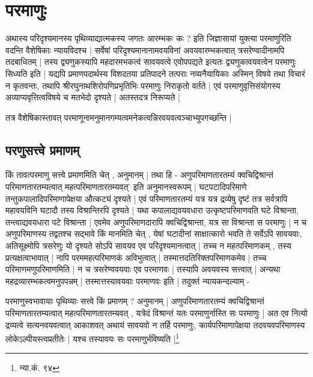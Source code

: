\section{परमाणुः}

अथास्य परिदृश्यमानस्य पृथिव्याद्यात्मकस्य जगतः आरम्भकः कः ? इति जिज्ञासायां युक्त्या परमाणुरिति वदन्ति वैशेषिकाः न्यायविदश्च | सर्वेषां परिदृश्यमानानामवयविनां अवयवारम्भकत्वात् त्रसरेण्वादीनामपि तदबाधितम् | तस्य द्व्यणुकस्यापि महदारमभकत्वं सावयवत्वे एवोपपद्यते इत्यतः द्व्यणुकावयवत्वेन परमाणुः सिध्यति इति | यद्यपि प्रमाणपदार्थस्य विशदतया प्रतिपादने तत्पराः नव्यनैयायिकाः अस्मिन् विषये तथा विचारं न कृतवन्तः, तथापि श्रीरघुनाथशिरोपणिप्रभृतिभिः परमाणुः निराकृतो वर्तते | एवं परमाणुवृत्तिसंयोगस्य अव्याप्यवृत्तित्वविषये च मतभेदो दृश्यते | अतस्तदत्र निरूप्यते |

तत्र वैशेषिकास्तावत् परमाणूनामनुमानगम्यत्वमनेकत्वन्निरवयवत्वञ्चाभ्युपगच्छन्ति |

\subsection{परणुसत्त्वे प्रमाणम्}

किं तावत्परमाणु सत्त्वे प्रमाणमिति चेत् , अनुमानम् | तथा हि - अणुपरिमाणतारतम्यं क्वचिद्विश्रान्तं परिमाणतारतम्यत्वात् महत्परिमाणतारतम्यवत्' इति अनुमानस्वरूपम् | घटपटादिपरिमाणे तन्तुकपालादिपरिमाणापेक्षया औत्कट्यं दृश्यते | एवं परिमाणतारतम्यं यत्र यत्र द्रव्येषु दृष्टं तत्र सर्वत्रापि महावयविनि घटादौ तस्य विश्रान्तिरपि दृश्यते | यथा कपालाद्यवयवधारा उत्कृष्टपरिमाणवति घटे विश्रान्ता, तन्त्वाद्यवयधारा पटे विश्रान्ता | एवमेव अणुपरिमाणदारापि क्वचिद्विश्रान्ता, यत्र सा विश्रान्ता स परमाणुः | न च अणुपरिमाणस्य तद्वतश्च सद्भावे किं मानमिति चेत् , येषां घटादीनां साक्षात्कारो भवति ते सर्वेऽपि सावयवाः, अतिसूक्ष्मोपि त्रसरेणुः यो दृश्यते सोऽपि सावयव एव परिदृश्यमानत्वात् | तच्च न महत्परिमाणकम् , तस्य प्रत्यक्षत्वाभावात् | नापि परममहत्परिमाणकं अविभुत्वात् | तस्मात्तदतिरिक्तपरिमाणकमेव | तच्च परिमाणमणुपरिमाणमिति | न च त्रसरेण्ववयवाः एव परमाणवः | तस्यापि अवयवस्य सत्त्वात् | अन्यथा महद्रव्यारम्भकत्वमनुपपन्नम् | तस्मात्तस्यावयवाः परमाणवः इति | तदुक्तं न्यायकन्दल्याम् - 

{\fontsize{11.7}{0}\selectfont\s परमाणुस्वभावायाः पृथिव्याः सत्त्वे किं प्रमाणम् ? अनुमानम् | अणुपरिमाणतारतम्यं क्वचिद्विश्रान्तं परिमाणतारतम्यत्वात् महत्परिमाणतारतम्यवत् , यत्रेदं विश्रान्तं यतः परमाणुर्नास्ति सः परमाणुः | अत एव नित्यो द्रव्यत्वे सत्यनवयवत्वात् आकाशवत् अथायं सावयवो न तर्हि परमाणुः, कार्यपरिमाणापेक्षया तदवयवपरिमाणस्य लोकेऽल्पीयस्त्वप्रतीतेः | यश्च तस्यावयः सः परमाणुर्भविष्यति |\footnote{न्या.कं. ९४}}

